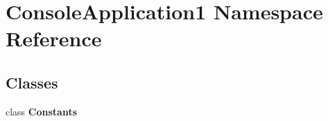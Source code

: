 \hypertarget{namespace_console_application1}{}\section{Console\+Application1 Namespace Reference}
\label{namespace_console_application1}
\subsection*{Classes}
\begin{DoxyCompactItemize}
\item 
class {\bfseries Constants}
\end{DoxyCompactItemize}
